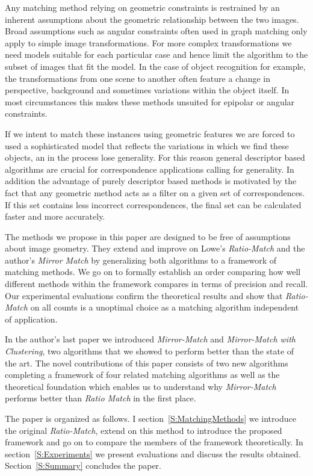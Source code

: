 \documentclass[journal]{IEEEtran}
\begin{document}
Any matching method relying on geometric constraints is restrained by an
inherent assumptions about the geometric relationship between the two 
images. Broad assumptions such as angular constraints often used in 
graph matching only apply to simple image transformations. For more 
complex transformations we need models suitable for each particular case 
and hence limit the algorithm to the subset of images that fit the 
model. In the case of object recognition for example, the 
transformations from one scene to another often feature a change in 
perspective, background and sometimes variations within the object 
itself. In most circumstances this makes these methods unsuited for 
epipolar or angular constraints.

If we intent to match these instances using geometric features we are 
forced to used a sophisticated model that reflects the variations in 
which we find these objects, an in the process lose generality. For this 
reason general descriptor based algorithms are crucial for 
correspondence applications calling for generality. In addition the 
advantage of purely descriptor based methods is motivated by the fact 
that any geometric method acts as a filter on a given set of 
correspondences.  If this set contains less incorrect correspondences, 
the final set can be calculated faster and more accurately.

The methods we propose in this paper are designed to be free of 
assumptions about image geometry. They extend and improve on Lowe's 
\emph{Ratio-Match} \cite{lowe2004sift} and the author's \emph{Mirror 
Match} \cite{arnfred2013mirror} by generalizing both algorithms to a 
framework of matching methods. We go on to formally establish an order 
comparing how well different methods within the framework compares in 
terms of precision and recall. Our experimental evaluations confirm the 
theoretical results and show that \emph{Ratio-Match} on all counts is a 
unoptimal choice as a matching algorithm independent of application. 

In the author's last paper we introduced \emph{Mirror-Match} and 
\emph{Mirror-Match with Clustering}, two algorithms that we showed to 
perform better than the state of the art. The novel contributions of 
this paper consists of two new algorithms completing a framework of four 
related matching algorithms as well as the theoretical foundation which 
enables us to understand why \emph{Mirror-Match} performs better than 
\emph{Ratio Match} in the first place.

The paper is organized as follows. I section~\ref{S:MatchingMethods} we 
introduce the original \emph{Ratio-Match}, extend on this method to 
introduce the proposed framework and go on to compare the members of the 
framework theoretically.  In section~\ref{S:Experiments} we present 
evaluations and discuss the results obtained.  Section~\ref{S:Summary} 
concludes the paper.
\end{document}
